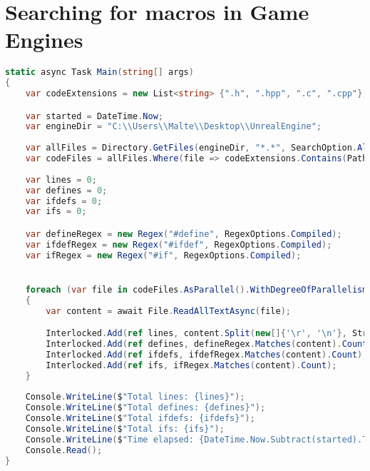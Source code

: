 \chapter{Searching for macros in Game Engines}\label{app:unreal:macros}
\begin{lstlisting}[label={lst:game:engine:macro:search}, caption={Searching for the use of macros in a game engine}, language={csharp}]
static async Task Main(string[] args)
{
    var codeExtensions = new List<string> {".h", ".hpp", ".c", ".cpp"};

    var started = DateTime.Now;
    var engineDir = "C:\\Users\\Malte\\Desktop\\UnrealEngine";
    
    var allFiles = Directory.GetFiles(engineDir, "*.*", SearchOption.AllDirectories);
    var codeFiles = allFiles.Where(file => codeExtensions.Contains(Path.GetExtension(file))).ToList();
    
    var lines = 0;
    var defines = 0;
    var ifdefs = 0;
    var ifs = 0;

    var defineRegex = new Regex("#define", RegexOptions.Compiled);
    var ifdefRegex = new Regex("#ifdef", RegexOptions.Compiled);
    var ifRegex = new Regex("#if", RegexOptions.Compiled);


    foreach (var file in codeFiles.AsParallel().WithDegreeOfParallelism(4))
    {
        var content = await File.ReadAllTextAsync(file);

        Interlocked.Add(ref lines, content.Split(new[]{'\r', '\n'}, StringSplitOptions.RemoveEmptyEntries).Length);
        Interlocked.Add(ref defines, defineRegex.Matches(content).Count);
        Interlocked.Add(ref ifdefs, ifdefRegex.Matches(content).Count);
        Interlocked.Add(ref ifs, ifRegex.Matches(content).Count);
    }
    
    Console.WriteLine($"Total lines: {lines}");
    Console.WriteLine($"Total defines: {defines}");
    Console.WriteLine($"Total ifdefs: {ifdefs}");
    Console.WriteLine($"Total ifs: {ifs}");
    Console.WriteLine($"Time elapsed: {DateTime.Now.Subtract(started).TotalSeconds} seconds");
    Console.Read();
}
\end{lstlisting}